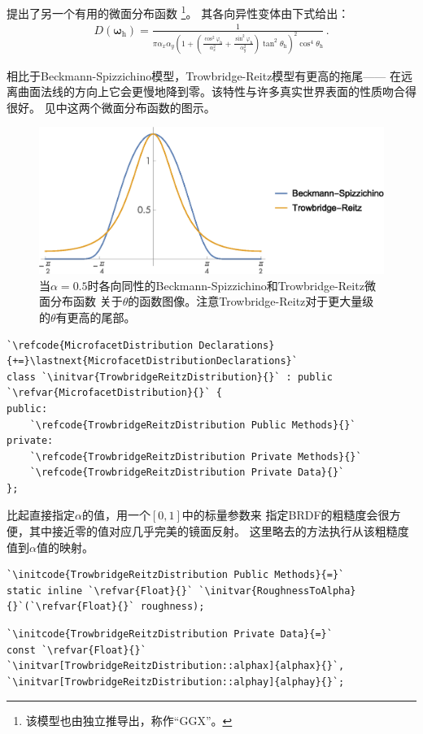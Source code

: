 \citet{Trowbridge:75}提出了另一个有用的微面分布函数
\footnote{该模型也由\citet{10.5555/2383847.2383874}独立推导出，称作“GGX”。}。
其各向异性变体由下式给出：
\begin{align}\label{eq:8.11}
    D({\bm\omega}_{\mathrm{h}})=\frac{1}{\pi\alpha_x\alpha_y\left(1+\left(\frac{\cos^2\varphi_{\mathrm{h}}}{\alpha_x^2}+\frac{\sin^2\varphi_{\mathrm{h}}}{\alpha_y^2}\right)\tan^2\theta_{\mathrm{h}}\right)^2\cos^4\theta_{\mathrm{h}}}\, .
\end{align}

相比于Beckmann-Spizzichino模型，Trowbridge-Reitz模型有更高的拖尾——
在远离曲面法线的方向上它会更慢地降到零。该特性与许多真实世界表面的性质吻合得很好。
见中这两个微面分布函数的图示。
\begin{figure}[htbp]
    \centering
    \includegraphics[width=0.75\linewidth]{Pictures/chap08/beckmann-vs-tr-tails.eps}
    \caption{当$\alpha=0.5$时各向同性的Beckmann-Spizzichino和Trowbridge-Reitz微面分布函数
        关于$\theta$的函数图像。注意Trowbridge-Reitz对于更大量级的$\theta$有更高的尾部。}
    \label{fig:8.16}
\end{figure}

\begin{lstlisting}
`\refcode{MicrofacetDistribution Declarations}{+=}\lastnext{MicrofacetDistributionDeclarations}`
class `\initvar{TrowbridgeReitzDistribution}{}` : public `\refvar{MicrofacetDistribution}{}` {
public:
    `\refcode{TrowbridgeReitzDistribution Public Methods}{}`
private:
    `\refcode{TrowbridgeReitzDistribution Private Methods}{}`
    `\refcode{TrowbridgeReitzDistribution Private Data}{}`
};
\end{lstlisting}

比起直接指定$\alpha$的值，用一个$[0,1]$中的标量参数来
指定BRDF的粗糙度会很方便，其中接近零的值对应几乎完美的镜面反射。
这里略去的方法执行从该粗糙度值到$\alpha$值的映射。
\begin{lstlisting}
`\initcode{TrowbridgeReitzDistribution Public Methods}{=}`
static inline `\refvar{Float}{}` `\initvar{RoughnessToAlpha}{}`(`\refvar{Float}{}` roughness);
\end{lstlisting}
\begin{lstlisting}
`\initcode{TrowbridgeReitzDistribution Private Data}{=}`
const `\refvar{Float}{}` `\initvar[TrowbridgeReitzDistribution::alphax]{alphax}{}`, `\initvar[TrowbridgeReitzDistribution::alphay]{alphay}{}`;
\end{lstlisting}

